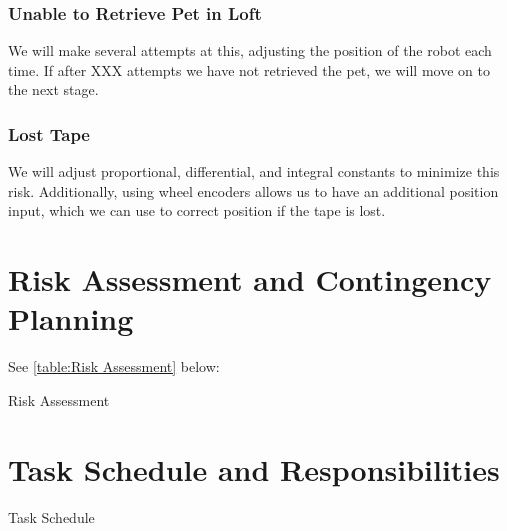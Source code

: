 \documentclass[11pt, oneside]{article} %
\begin{document}
		\subsubsection{Unable to Retrieve Pet in Loft}
		We will make several attempts at this, adjusting the position of the robot each time. If after XXX attempts we have not retrieved the pet, we will move on to the next stage.
		\subsubsection{Lost Tape}
		We will adjust proportional, differential, and integral constants to minimize this risk. Additionally, using wheel encoders allows us to have an additional position input, which we can use to correct position if the tape is lost.


\section{Risk Assessment and Contingency Planning}

See \autoref{table:Risk Assessment} below:
\begin{table}
	\caption{Risk Assessment}
	\centering
	\label{table:Risk Assessment}
\end{table}


\section{Task Schedule and Responsibilities}

\begin{table}
	\caption{Task Schedule}
	\centering
	\label{table:Task Schedule}
\end{table}


\end{document}
